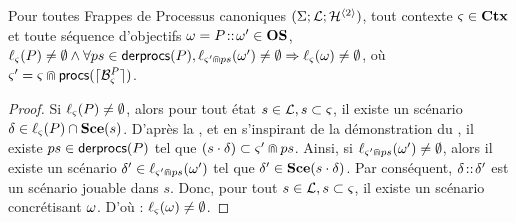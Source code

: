\begin{theorem}
  Pour toutes Frappes de Processus canoniques $(\Sigma; \mathcal{L}; \mathcal{H}^{\langle 2 \rangle})$,
  tout contexte $\varsigma \in \mathbf{Ctx}$ et toute séquence d'objectifs $\omega = P \!::\! \omega' \in \mathbf{OS}$,
  $\ell_\varsigma(P) \neq \emptyset \wedge \forall ps \in \mathsf{derprocs}(P),
    \ell_{\varsigma' \Cap ps}(\omega') \neq \emptyset
    \Rightarrow \ell_\varsigma(\omega) \neq \emptyset$,
  où $\varsigma' = \varsigma \Cap \mathsf{procs}(\lceil \mathcal{B}_{\varsigma}^{P}\rceil)$.
\end{theorem}

\begin{proof} %
  Si $\ell_\varsigma(P) \neq \emptyset$, alors pour tout état $s \in \mathcal{L}, s \subset \varsigma$,
  il existe un scénario $\delta \in \ell_\varsigma(P) \cap \mathbf{Sce}(s)$.
  D'après la ,
  et en s'inspirant de la démonstration du ,
  il existe $ps \in \mathsf{derprocs}(P)$ tel que $(s \cdot \delta) \subset \varsigma' \Cap ps$.
  Ainsi, si $\ell_{\varsigma' \Cap ps}(\omega') \neq \emptyset$,
  alors il existe un scénario $\delta' \in \ell_{\varsigma' \Cap ps}(\omega')$ tel que
  $\delta' \in \mathbf{Sce}(s \cdot \delta)$.
  Par conséquent, $\delta \!::\! \delta'$ est un scénario jouable dans $s$.
  Donc, pour tout $s \in \mathcal{L}, s \subset \varsigma$, il existe un scénario concrétisant $\omega$.
  D'où : $\ell_\varsigma(\omega) \neq \emptyset$.
\end{proof}
